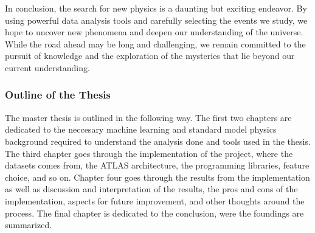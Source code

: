 In conclusion, the search for new physics is a daunting but exciting endeavor. By using powerful data analysis tools and carefully selecting the events we study, we hope to uncover new phenomena and deepen our understanding of the universe. While the road ahead may be long and challenging, we remain committed to the pursuit of knowledge and the exploration of the mysteries that lie beyond our current understanding.

\subsubsection*{Outline of the Thesis}
The master thesis is outlined in the following way. The first two chapters are dedicated to the neccesary machine learning and
standard model physics background required to understand the analysis done and tools used in the thesis. The third chapter goes 
through the implementation of the project, where the datasets comes from, the ATLAS architecture, the programming libraries, 
feature choice, and so on. Chapter four goes through the results from the implementation as well as discussion and 
interpretation of the results, the pros and cons of the implementation, aspects for future improvement, and other thoughts around the process.
The final chapter is dedicated to the conclusion, were the foundings are summarized. 


